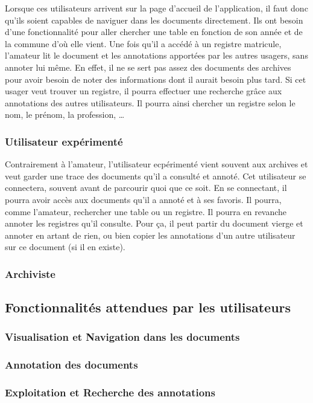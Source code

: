 \documentclass[a4paper]{article}
\begin{document}
Lorsque ces utilisateurs arrivent sur la page d'accueil de l'application, il faut donc qu'ils soient capables de naviguer dans les documents directement. Ils ont besoin d'une fonctionnalité pour aller chercher une table en fonction de son année et de la commune d'où elle vient. Une fois qu'il a accédé à un registre matricule, l'amateur lit le document et les annotations apportées par les autres usagers, sans annoter lui même. En effet, il ne se sert pas assez des documents des archives pour avoir besoin de noter des informations dont il aurait besoin plus tard. Si cet usager veut trouver un registre, il pourra effectuer une recherche grâce aux annotations des autres utilisateurs. Il pourra ainsi chercher un registre selon le nom, le prénom, la profession, \ldots

\subsubsection{Utilisateur expérimenté}
Contrairement à l'amateur, l'utilisateur ecpérimenté vient souvent aux archives et veut garder une trace des documents qu'il a consulté et annoté. Cet utilisateur se connectera, souvent avant de parcourir quoi que ce soit. En se connectant, il pourra avoir accès aux documents qu'il a annoté et à ses favoris. Il pourra, comme l'amateur, rechercher une table ou un registre. Il pourra en revanche annoter les registres qu'il consulte. Pour ça, il peut partir du document vierge et annoter en artant de rien, ou bien copier les annotations d'un autre utilisateur sur ce document (si il en existe).

\subsubsection{Archiviste}

\subsection{Fonctionnalités attendues par les utilisateurs}
\subsubsection{Visualisation et Navigation dans les documents}
\subsubsection{Annotation des documents}
\subsubsection{Exploitation et Recherche des annotations}
\end{document}
